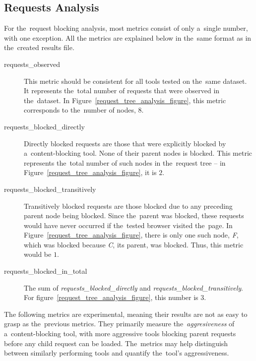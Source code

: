 \subsection{Requests Analysis}
\label{metrics-section}
For the~request blocking analysis, most metrics consist of only a~single number, with one exception. All 
the metrics are explained below in the~same format as in the~created results file.

\begin{description}
\item[requests\_observed]
This metric should be consistent for all tools tested on the~same dataset. It represents the~total number of requests that were observed in the~dataset. In Figure~\ref{request_tree_analysis_figure}, this metric corresponds to the~number of nodes, $8$.

\item[requests\_blocked\_directly] 
Directly blocked requests are those that were explicitly blocked by a~content-blocking tool. None of their parent nodes is blocked. This metric represents the~total number of such nodes in the~request tree -- in Figure~\ref{request_tree_analysis_figure}, it is $2$.

\item[requests\_blocked\_transitively]
Transitively blocked requests are those blocked due to any preceding parent node being blocked. Since the~parent was blocked, these requests would have never occurred if the~tested browser visited the~page. In Figure~\ref{request_tree_analysis_figure}, there is only one such node, \emph{F}, which was blocked because \emph{C}, its parent, was blocked. Thus, this metric would be $1$.

\item[requests\_blocked\_in\_total]
The sum of \textit{requests\_blocked\_directly} and \textit{requests\_{\linebreak}blocked\_transitively}. For figure~\ref{request_tree_analysis_figure}, this number is $3$.

\end{description}

The following metrics are experimental, meaning their results are not as easy to grasp as the~previous metrics. They primarily measure the~\textit{aggresiveness} of a~content-blocking tool, with more aggressive tools blocking parent requests before any child request can be loaded. The~metrics may help distinguish between similarly performing tools and quantify the~tool's aggressiveness.

